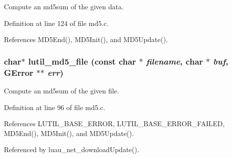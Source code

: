 Compute an md5sum of the given data. 



Definition at line 124 of file md5.c.

References MD5End(), MD5Init(), and MD5Update().
\subsubsection{\setlength{\rightskip}{0pt plus 5cm}char$\ast$ lutil\_\-md5\_\-file (const char $\ast$ {\em filename}, char $\ast$ {\em buf}, GError $\ast$$\ast$ {\em err})}\label{md5_8h_a2}


Compute an md5sum of the given file. 



Definition at line 96 of file md5.c.

References LUTIL\_\-BASE\_\-ERROR, LUTIL\_\-BASE\_\-ERROR\_\-FAILED, MD5End(), MD5Init(), and MD5Update().

Referenced by luau\_\-net\_\-download\-Update().
